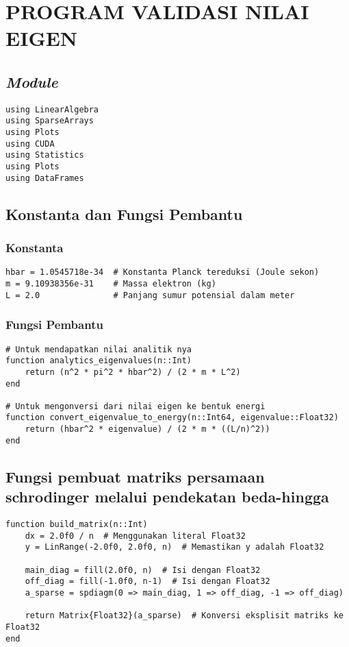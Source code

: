 \chapter{PROGRAM VALIDASI NILAI EIGEN}
\label{appx:eigenvalue_validation}

\section{\emph{Module}}

\begin{lstlisting}
using LinearAlgebra
using SparseArrays
using Plots
using CUDA
using Statistics
using Plots
using DataFrames
\end{lstlisting}

\section{Konstanta dan Fungsi Pembantu}

\subsection{Konstanta}

\begin{lstlisting}
hbar = 1.0545718e-34  # Konstanta Planck tereduksi (Joule sekon)
m = 9.10938356e-31    # Massa elektron (kg)
L = 2.0               # Panjang sumur potensial dalam meter
\end{lstlisting}

\subsection{Fungsi Pembantu}

\begin{lstlisting}
# Untuk mendapatkan nilai analitik nya
function analytics_eigenvalues(n::Int)
    return (n^2 * pi^2 * hbar^2) / (2 * m * L^2)
end

# Untuk mengonversi dari nilai eigen ke bentuk energi
function convert_eigenvalue_to_energy(n::Int64, eigenvalue::Float32)
    return (hbar^2 * eigenvalue) / (2 * m * ((L/n)^2))
end
\end{lstlisting}

\section{Fungsi pembuat matriks persamaan schrodinger melalui pendekatan beda-hingga}

\begin{lstlisting}
function build_matrix(n::Int)
    dx = 2.0f0 / n  # Menggunakan literal Float32
    y = LinRange(-2.0f0, 2.0f0, n)  # Memastikan y adalah Float32

    main_diag = fill(2.0f0, n)  # Isi dengan Float32
    off_diag = fill(-1.0f0, n-1)  # Isi dengan Float32
    a_sparse = spdiagm(0 => main_diag, 1 => off_diag, -1 => off_diag)

    return Matrix{Float32}(a_sparse)  # Konversi eksplisit matriks ke Float32
end
\end{lstlisting}

